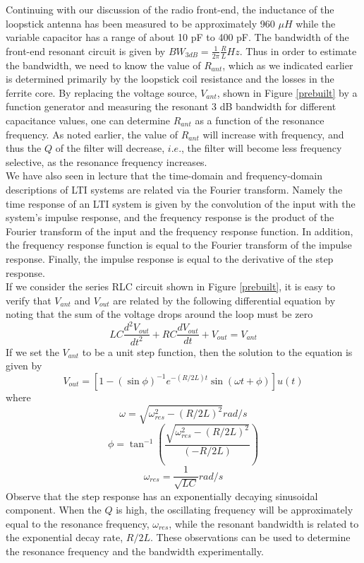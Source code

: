\documentclass{article}
\begin{document}
Continuing with our discussion of the radio front-end, the inductance of the loopstick antenna has been measured to be approximately 960 $\mu H$ while the variable capacitor has a range of about 10 pF to 400 pF. The bandwidth of the front-end resonant circuit is given by $BW_{3dB} = \frac{1}{2\pi}\frac{R}{L}Hz$. Thus in order to estimate the bandwidth, we need to know the value of $R_{ant}$, which as we indicated earlier is determined primarily by the loopstick coil resistance and the losses in the ferrite core. By replacing the voltage source, $V_{ant}$, shown in Figure \ref{prebuilt} by a function generator and measuring the resonant 3 dB bandwidth for different capacitance values, one can determine $R_{ant}$ as a function of the resonance frequency. As noted earlier, the value of $R_{ant}$ will increase with frequency, and thus the $Q$ of the filter will decrease, $i.e.$, the filter will become less frequency selective, as the resonance frequency increases.\\
We have also seen in lecture that the time-domain and frequency-domain descriptions of LTI systems are related via the Fourier transform. Namely the time response of an LTI system is given by the convolution of the input with the system’s impulse response, and the frequency response is the product of the Fourier transform of the input and the frequency response function. In addition, the frequency response function is equal to the Fourier transform of the impulse response. Finally, the impulse response is equal to the derivative of the step response.\\
If we consider the series RLC circuit shown in Figure \ref{prebuilt}, it is easy to verify that $V_{ant}$ and $V_{out}$ are related by the following differential equation by noting that the sum of the voltage drops around the loop must be zero
$$LC\frac{d^2V_{out}}{dt^2}+RC\frac{dV_{out}}{dt}+V_{out} = V_{ant}$$
If we set the $V_{ant}$ to be a unit step function, then the solution to the equation is given by
$$V_{out} = [1-(\sin\phi)^{-1}e^{-(R/2L)t}\sin(\omega t+\phi)]u(t)$$
where
$$\omega = \sqrt{\omega_{res}^2-(R/2L)^2}rad/s$$
$$\phi = \tan^{-1}(\frac{\sqrt{\omega_{res}^2-(R/2L)^2}}{(-R/2L)})$$
$$\omega_{res} = \frac{1}{\sqrt{LC}}rad/s$$
Observe that the step response has an exponentially decaying sinusoidal component. When the $Q$ is high, the oscillating frequency will be approximately equal to the resonance frequency, $\omega_{res}$, while the resonant bandwidth is related to the exponential decay rate, $R/2L$. These observations can be used to determine the resonance frequency and the bandwidth experimentally.
\end{document}
